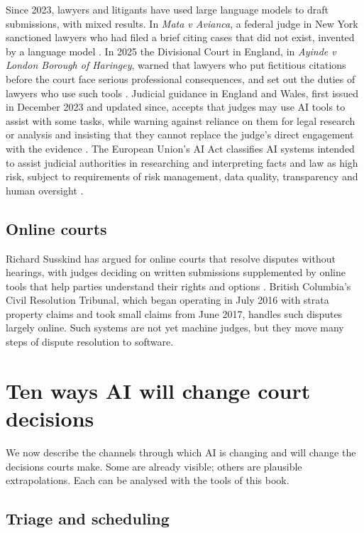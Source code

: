Since 2023, lawyers and litigants have used large language models to draft submissions, with mixed results. In \emph{Mata v Avianca}, a federal judge in New York sanctioned lawyers who had filed a brief citing cases that did not exist, invented by a language model \citep{mata2023}. In 2025 the Divisional Court in England, in \emph{Ayinde v London Borough of Haringey}, warned that lawyers who put fictitious citations before the court face serious professional consequences, and set out the duties of lawyers who use such tools \citep{ayinde2025}. Judicial guidance in England and Wales, first issued in December 2023 and updated since, accepts that judges may use AI tools to assist with some tasks, while warning against reliance on them for legal research or analysis and insisting that they cannot replace the judge's direct engagement with the evidence \citep{judguidance2025}. The European Union's AI Act classifies AI systems intended to assist judicial authorities in researching and interpreting facts and law as high risk, subject to requirements of risk management, data quality, transparency and human oversight \citep{euaiact2024}.

\subsection{Online courts}

Richard Susskind has argued for online courts that resolve disputes without hearings, with judges deciding on written submissions supplemented by online tools that help parties understand their rights and options \citep{susskind2019}. British Columbia's Civil Resolution Tribunal, which began operating in July 2016 with strata property claims and took small claims from June 2017, handles such disputes largely online. Such systems are not yet machine judges, but they move many steps of dispute resolution to software.

\section{Ten ways AI will change court decisions}

We now describe the channels through which AI is changing and will change the decisions courts make. Some are already visible; others are plausible extrapolations. Each can be analysed with the tools of this book.

\subsection{Triage and scheduling}

